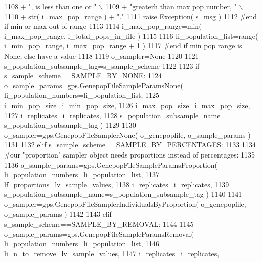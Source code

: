 \begin{DoxyCode}
1108                         + \textcolor{stringliteral}{", is less than one or "} \(\backslash\)
1109                         + \textcolor{stringliteral}{"greaterh than max pop number, "} \(\backslash\)
1110                         + str( i\_max\_pop\_range ) + \textcolor{stringliteral}{"."} 
1111             \textcolor{keywordflow}{raise} Exception( s\_msg )
1112         \textcolor{comment}{#end if min or max out of range}
1113 
1114         i\_max\_pop\_range=min( i\_max\_pop\_range, i\_total\_pops\_in\_file )
1115 
1116         li\_population\_list=range( i\_min\_pop\_range, i\_max\_pop\_range + 1 )
1117     \textcolor{comment}{#end if min pop range is None, else have a value}
1118 
1119     o\_sampler=\textcolor{keywordtype}{None}  
1120 
1121     s\_population\_subsample\_tag=s\_sample\_scheme
1122 
1123     \textcolor{keywordflow}{if} s\_sample\_scheme==SAMPLE\_BY\_NONE:
1124         o\_sample\_params=gps.GenepopFileSampleParamsNone( li\_population\_numbers=li\_population\_list,
1125                                                             i\_min\_pop\_size=i\_min\_pop\_size,
1126                                                             i\_max\_pop\_size=i\_max\_pop\_size,
1127                                                             i\_replicates=i\_replicates,
1128                                                             s\_population\_subsample\_name=
      s\_population\_subsample\_tag )    
1129 
1130         o\_sampler=gps.GenepopFileSamplerNone( o\_genepopfile, o\_sample\_params )
1131 
1132     \textcolor{keywordflow}{elif} s\_sample\_scheme==SAMPLE\_BY\_PERCENTAGES:
1133 
1134         \textcolor{comment}{#our "proportion" sampler object needs proportions instead of percentages:}
1135 
1136         o\_sample\_params=gps.GenepopFileSampleParamsProportion( li\_population\_numbers=li\_population\_list,
1137                                                 lf\_proportions=lv\_sample\_values,
1138                                                 i\_replicates=i\_replicates,
1139                                                 s\_population\_subsample\_name=s\_population\_subsample\_tag )
1140 
1141         o\_sampler=gps.GenepopFileSamplerIndividualsByProportion( o\_genepopfile, o\_sample\_params )
1142 
1143     \textcolor{keywordflow}{elif} s\_sample\_scheme==SAMPLE\_BY\_REMOVAL:
1144 
1145         o\_sample\_params=gps.GenepopFileSampleParamsRemoval( li\_population\_numbers=li\_population\_list,
1146                                                 li\_n\_to\_remove=lv\_sample\_values,
1147                                                 i\_replicates=i\_replicates,

\end{DoxyCode}
